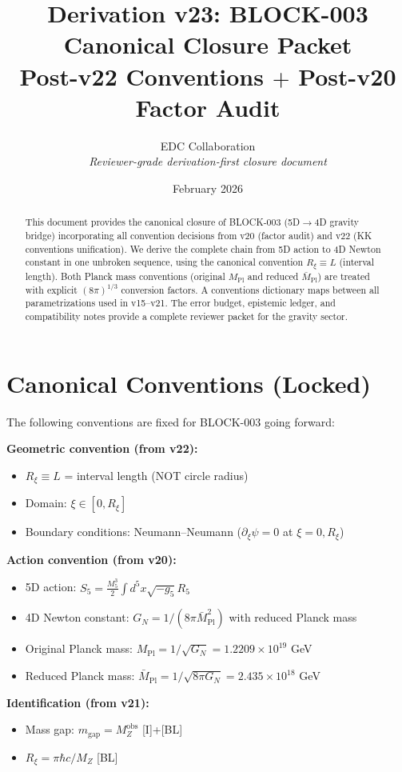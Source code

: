 \documentclass[11pt,a4paper]{article}
\title{Derivation v23: BLOCK-003 Canonical Closure Packet\\
\large Post-v22 Conventions $+$ Post-v20 Factor Audit}
\author{EDC Collaboration\\[3pt]
\small\textit{Reviewer-grade derivation-first closure document}}
\date{February 2026}
\newcommand{\Rxi}{R_\xi}
\newcommand{\Mpl}{M_{\mathrm{Pl}}}
\newcommand{\Mplbar}{\bar{M}_{\mathrm{Pl}}}
\newcommand{\Mfive}{M_5}
\newcommand{\GN}{G_N}
\newcommand{\MZ}{M_Z}
\newcommand{\mgap}{m_{\mathrm{gap}}}
\begin{document}
\maketitle

\begin{abstract}
This document provides the canonical closure of BLOCK-003 (5D$\to$4D gravity bridge)
incorporating all convention decisions from v20 (factor audit) and v22 (KK conventions
unification). We derive the complete chain from 5D action to 4D Newton constant in
one unbroken sequence, using the canonical convention $\Rxi \equiv L$ (interval length).
Both Planck mass conventions (original $\Mpl$ and reduced $\Mplbar$) are treated with
explicit $(8\pi)^{1/3}$ conversion factors. A conventions dictionary maps between all
parametrizations used in v15--v21. The error budget, epistemic ledger, and compatibility
notes provide a complete reviewer packet for the gravity sector.
\end{abstract}

\tableofcontents
\newpage

\section{Canonical Conventions (Locked)}

\begin{tcolorbox}[title=Master Convention Lock, colback=blue!5, colframe=blue!50]
The following conventions are fixed for BLOCK-003 going forward:

\textbf{Geometric convention (from v22):}
\begin{itemize}
\item $\Rxi \equiv L$ = interval length (NOT circle radius)
\item Domain: $\xi \in [0, \Rxi]$
\item Boundary conditions: Neumann--Neumann ($\partial_\xi\psi = 0$ at $\xi = 0, \Rxi$)
\end{itemize}

\textbf{Action convention (from v20):}
\begin{itemize}
\item 5D action: $S_5 = \frac{\Mfive^3}{2}\int d^5x\sqrt{-g_5}R_5$
\item 4D Newton constant: $\GN = 1/(8\pi\Mplbar^2)$ with reduced Planck mass
\item Original Planck mass: $\Mpl = 1/\sqrt{\GN} = 1.2209 \times 10^{19}$ GeV
\item Reduced Planck mass: $\Mplbar = 1/\sqrt{8\pi\GN} = 2.435 \times 10^{18}$ GeV
\end{itemize}

\textbf{Identification (from v21):}
\begin{itemize}
\item Mass gap: $\mgap = \MZ^{\mathrm{obs}}$ [I]+[BL]
\item $\Rxi = \pi\hbar c/\MZ$ [BL]
\end{itemize}
\end{tcolorbox}
\end{document}
